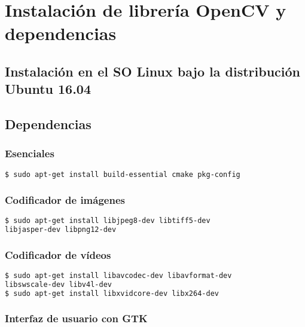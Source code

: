 \chapter{Instalación de librería OpenCV y dependencias}
\label{apendiceA}


\section{Instalación en el SO Linux bajo la distribución Ubuntu 16.04}

\section*{Dependencias}

\subsection*{Esenciales}

\begin{lstlisting}[language=bash]
$ sudo apt-get install build-essential cmake pkg-config
\end{lstlisting}

\subsection*{Codificador de imágenes}

\begin{lstlisting}[language=bash]
$ sudo apt-get install libjpeg8-dev libtiff5-dev 
libjasper-dev libpng12-dev
\end{lstlisting}

\subsection*{Codificador de vídeos}

\begin{lstlisting}[language=bash]
$ sudo apt-get install libavcodec-dev libavformat-dev 
libswscale-dev libv4l-dev
$ sudo apt-get install libxvidcore-dev libx264-dev
\end{lstlisting}

\subsection*{Interfaz de usuario con GTK}

